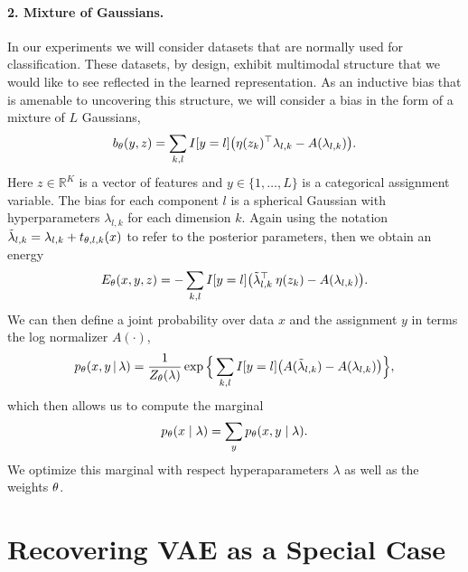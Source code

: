 \documentclass[tablecaption=bottom,wcp]{jmlr} %
\begin{document}
\paragraph{2. Mixture of Gaussians.} In our experiments we will consider datasets that are normally used for classification. These datasets, by design, exhibit multimodal structure that we would like to see reflected in the learned representation. As an inductive bias that is amenable to uncovering this structure, we will consider a bias in the form of a mixture of $L$ Gaussians,
\begin{align*}
    b_\theta(y,z) = \sum_{k,l} I[y=l] \big( \eta(z_k)^\top \lambda_{l,k} - A(\lambda_{l,k}) \big).
\end{align*}
Here $z \in \mathbb{R}^K$ is a vector of features and $y \in \{1, \dots, L\}$ is a categorical assignment variable. The bias for each component $l$ is a spherical Gaussian with hyperparameters $\lambda_{l,k}$ for each dimension $k$. Again using the notation $\tilde{\lambda}_{l,k} = \lambda_{l,k} + t_{\theta,l,k}(x)$ to refer to the posterior parameters, then we obtain an energy
\begin{align*}
    E_\theta(x,y,z) =
    -
    \sum_{k,l}
    I[y=l]
    \big(  
        \tilde{\lambda}_{l,k}^\top \: \eta(z_k) 
        - A(\lambda_{l,k})
    \big).
\end{align*}
We can then define a joint probability over data $x$ and the assignment $y$ in terms the log normalizer $A(\cdot)$,
\begin{align*}
   p_\theta(x,y \,|\, \lambda) = 
  \frac{1}{Z_\theta(\lambda)}
  \exp \Big\{ 
    \sum_{k,l} 
    I[y=l]
    \big(
    A(\tilde{\lambda}_{l,k})
    -
    A(\lambda_{l,k})
    \big)
  \Big\},
\end{align*}
which then allows us to compute the marginal 
\begin{align}
    p_\theta(x \mid \lambda) = \sum_{y} p_\theta(x,y \mid \lambda).
\end{align}
We optimize this marginal with respect hyperaparameters $\lambda$ as well as the weights $\theta$.

\section{Recovering VAE as a Special Case}
\label{appendix:sec-vae-special-case}
\end{document}
